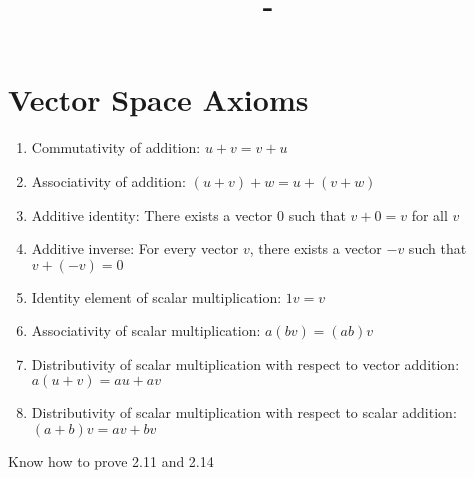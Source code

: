 \documentclass[answers,12pt,addpoints]{exam}
\author{\name}
\title{\course \ - \assignment}
\begin{document}
\maketitle
\tableofcontents
\newpage

\section{Vector Space Axioms}

\begin{enumerate}
    \item Commutativity of addition: $u+v = v+u$
    \item Associativity of addition: $(u+v)+w = u+(v+w)$
    \item Additive identity: There exists a vector $0$ such that $v+0 = v$ for all $v$
    \item Additive inverse: For every vector $v$, there exists a vector $-v$ such that $v+(-v) = 0$
    \item Identity element of scalar multiplication: $1v = v$
    \item Associativity of scalar multiplication: $a(bv) = (ab)v$
    \item Distributivity of scalar multiplication with respect to vector addition: $a(u+v) = au + av$
    \item Distributivity of scalar multiplication with respect to scalar addition: $(a+b)v = av + bv$
\end{enumerate}

Know how to prove 2.11 and 2.14
\end{document}
